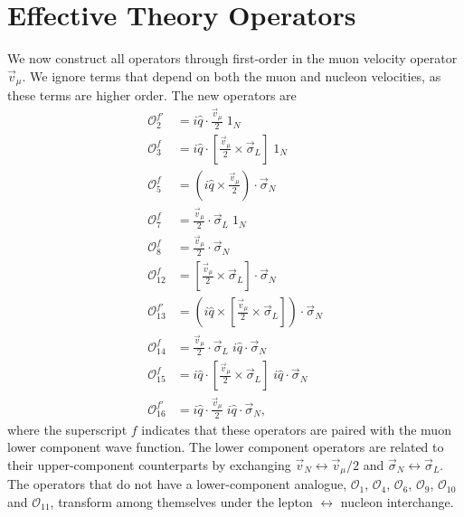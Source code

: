 \documentclass{book}[letterpaper,12pt]
\begin{document}
\section{Effective Theory Operators}
We now construct all operators through first-order in the muon velocity operator $\vec{v}_{\mu}$. We ignore terms that depend on both the muon and nucleon velocities, as these terms are higher order. The new operators are
\begin{equation}
\begin{split}
\mathcal{O}_2^{f'}&=i\hat{q}\cdot\frac{\vec{v}_{\mu}}{2}\;1_N\\
\mathcal{O}_3^f&=i\hat{q}\cdot\left[\frac{\vec{v}_{\mu}}{2}\times\vec{\sigma}_L\right]\;1_N\\
\mathcal{O}_5^f&=\left(i\hat{q}\times\frac{\vec{v}_{\mu}}{2}\right)\cdot\vec{\sigma}_N\\
\mathcal{O}_7^f&=\frac{\vec{v}_{\mu}}{2}\cdot\vec{\sigma}_L\;1_N\\
\mathcal{O}_8^f&=\frac{\vec{v}_{\mu}}{2}\cdot\vec{\sigma}_N\\
\mathcal{O}_{12}^f&=\left[\frac{\vec{v}_{\mu}}{2}\times\vec{\sigma}_L\right]\cdot\vec{\sigma}_N\\
\mathcal{O}_{13}^{f'}&=\left(i\hat{q}\times\left[\frac{\vec{v}_{\mu}}{2}\times\vec{\sigma}_L\right]\right)\cdot\vec{\sigma}_N\\
\mathcal{O}_{14}^f&=\frac{\vec{v}_{\mu}}{2}\cdot\vec{\sigma}_L\;i\hat{q}\cdot\vec{\sigma}_N\\
\mathcal{O}_{15}^f&=i\hat{q}\cdot\left[\frac{\vec{v}_{\mu}}{2}\times\vec{\sigma}_L\right]\;i\hat{q}\cdot\vec{\sigma}_N\\
\mathcal{O}_{16}^{f'}&=i\hat{q}\cdot\frac{\vec{v}_{\mu}}{2}\;i\hat{q}\cdot\vec{\sigma}_N,
\end{split}
\end{equation}
where the superscript $f$ indicates that these operators are paired with the muon lower component wave function. The lower component operators are related to their upper-component counterparts by exchanging $\vec{v}_N\leftrightarrow \vec{v}_{\mu}/2$ and $\vec{\sigma}_N\leftrightarrow\vec{\sigma}_L$. The operators that do not have a lower-component analogue, $\mathcal{O}_1$, $\mathcal{O}_4$, $\mathcal{O}_6$, $\mathcal{O}_9$, $\mathcal{O}_{10}$ and $\mathcal{O}_{11}$, transform among themselves under the lepton $\leftrightarrow$ nucleon interchange.
\end{document}
